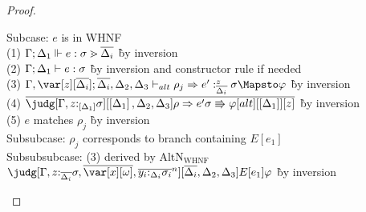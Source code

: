    \begin{proof}
   ~  
     \begin{tabbing}
       Subcase: $e$ is in WHNF\\
       (1) $\Gamma;\Delta_1 \Vdash e:\sigma \gtrdot \overline{\Delta_i}$ \` by inversion\\
       (2) $\Gamma ; \Delta_1 \vdash e : \sigma$ \` by inversion and constructor rule
       if needed\\
       (3) $\G,\var[z][\ov{\D_i}];\ov{\D_i},\D_2,\D_3 \vdash_{alt} \rho_j
       \Rightarrow e' :^z_{\ov{\D_i}} \s \Mapsto \vp$ \` by inversion\\
       (4) $\ov{\judg[\G,z{:}_{\irr{\D_1}}\s][\irr{\D_1},\D_2,\D_3]{\rho\Rightarrow e'}{\s
           \Rrightarrow \vp}[alt][\irr{\D_1}][z]}$ \` by inversion\\
       (5) $e$ matches $\rho_j$ \` by inversion\\
       Subsubcase: $\rho_j$ corresponds to branch containing $E[e_1]$\\
       Subsubsubcase: (3) derived by $\textrm{AltN}_{\textrm{WHNF}}$\\
       $\judg[\G, z{:}_{\ov{\Delta_i}} \sigma,\ov{\xo},\ov{y_i{:}_{\D_i}\s_i}^n][\ov{\D_i},\D_2,\D_3]{E[e_1]}{\vp}$
       \` by inversion\\
       

\end{tabbing}
\end{proof}
